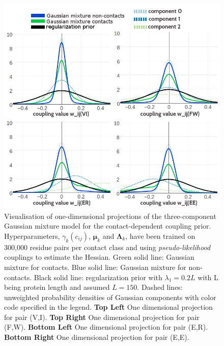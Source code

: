 \documentclass[11pt,a4paper,twoside]{book}
\newcommand{\eq}{\!=\!}
\newcommand{\Lk}{\mathbf{\Lambda}_k}
\newcommand{\muk}{\mathbf{\mu}_k}
\newcommand{\cij}{c_{ij}}
\theoremstyle{definition}
\theoremstyle{definition}
\theoremstyle{remark}
\begin{document}
\begin{figure}
\includegraphics[width=1\linewidth]{img/bayesian_model/pll/3/1dvis_combined_300k} \caption{Visualisation of one-dimensional
projections of the three-component Gaussian mixture model for the
contact-dependent coupling prior. Hyperparameters, \(\gamma_k(\cij)\),
\(\muk\) and \(\Lk\), have been trained on 300,000 residue pairs per
contact class and using \emph{pseudo-likelihood} couplings to estimate
the Hessian. Green solid line: Gaussian mixture for contacts. Blue solid
line: Gaussian mixture for non-contacts. Black solid line:
regularization prior with \(\lambda_1 \eq 0.2L\) with L being protein
length and assumed \(L\eq150\). Dashed lines: unweighted probability
densities of Gaussian components with color code specified in the
legend. \textbf{Top Left} One dimensional projection for pair (V,I).
\textbf{Top Right} One dimensional projection for pair (F,W).
\textbf{Bottom Left} One dimensional projection for pair (E,R).
\textbf{Bottom Right} One dimensional projection for pair (E,E).}\label{fig:vis1d-pll-3comp-300k}
\end{figure}
\end{document}
